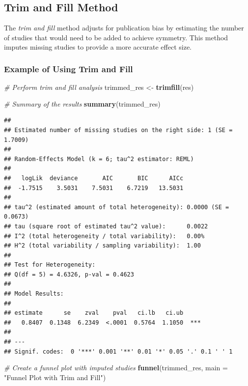 \documentclass[
]{book}
\newenvironment{Shaded}{\begin{snugshade}}{\end{snugshade}}
\newcommand{\AttributeTok}[1]{\textcolor[rgb]{0.13,0.29,0.53}{#1}}
\newcommand{\CommentTok}[1]{\textcolor[rgb]{0.56,0.35,0.01}{\textit{#1}}}
\newcommand{\FunctionTok}[1]{\textcolor[rgb]{0.13,0.29,0.53}{\textbf{#1}}}
\newcommand{\NormalTok}[1]{#1}
\newcommand{\OtherTok}[1]{\textcolor[rgb]{0.56,0.35,0.01}{#1}}
\newcommand{\StringTok}[1]{\textcolor[rgb]{0.31,0.60,0.02}{#1}}
\begin{document}
\subsection{Trim and Fill Method}\label{trim-and-fill-method}

The \emph{trim and fill} method adjusts for publication bias by estimating the number of studies that would need to be added to achieve symmetry. This method imputes missing studies to provide a more accurate effect size.

\subsubsection{Example of Using Trim and Fill}\label{example-of-using-trim-and-fill}

\begin{Shaded}
\begin{Highlighting}[]
\CommentTok{\# Perform trim and fill analysis}
\NormalTok{trimmed\_res }\OtherTok{\textless{}{-}} \FunctionTok{trimfill}\NormalTok{(res)}

\CommentTok{\# Summary of the results}
\FunctionTok{summary}\NormalTok{(trimmed\_res)}
\end{Highlighting}
\end{Shaded}

\begin{verbatim}
## 
## Estimated number of missing studies on the right side: 1 (SE = 1.7009)
## 
## Random-Effects Model (k = 6; tau^2 estimator: REML)
## 
##   logLik  deviance       AIC       BIC      AICc   
##  -1.7515    3.5031    7.5031    6.7219   13.5031   
## 
## tau^2 (estimated amount of total heterogeneity): 0.0000 (SE = 0.0673)
## tau (square root of estimated tau^2 value):      0.0022
## I^2 (total heterogeneity / total variability):   0.00%
## H^2 (total variability / sampling variability):  1.00
## 
## Test for Heterogeneity:
## Q(df = 5) = 4.6326, p-val = 0.4623
## 
## Model Results:
## 
## estimate      se    zval    pval   ci.lb   ci.ub      
##   0.8407  0.1348  6.2349  <.0001  0.5764  1.1050  *** 
## 
## ---
## Signif. codes:  0 '***' 0.001 '**' 0.01 '*' 0.05 '.' 0.1 ' ' 1
\end{verbatim}

\begin{Shaded}
\begin{Highlighting}[]
\CommentTok{\# Create a funnel plot with imputed studies}
\FunctionTok{funnel}\NormalTok{(trimmed\_res, }\AttributeTok{main =} \StringTok{"Funnel Plot with Trim and Fill"}\NormalTok{)}
\end{Highlighting}
\end{Shaded}
\end{document}
